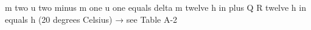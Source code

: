 m two u two minus m one u one equals delta m twelve h in plus Q R twelve  
h in equals h (20 degrees Celsius) → see Table A-2